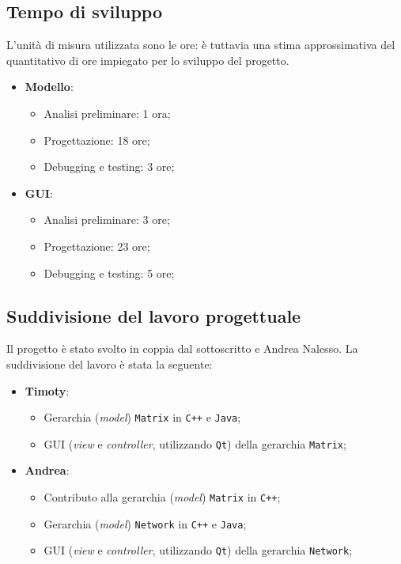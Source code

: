 \subsection{Tempo di sviluppo} 
L'unità di misura utilizzata sono le ore: è tuttavia una stima approssimativa del 
quantitativo di ore impiegato per lo sviluppo del progetto.
\begin{itemize}
    \item \textbf{Modello}:
    \begin{itemize}
        \item Analisi preliminare: 1 ora;
        \item Progettazione: 18 ore;
        \item Debugging e testing: 3 ore;
    \end{itemize}
    \item \textbf{GUI}:
    \begin{itemize}
        \item Analisi preliminare: 3 ore;
        \item Progettazione: 23 ore;
        \item Debugging e testing: 5 ore;
    \end{itemize}
\end{itemize}

\subsection{Suddivisione del lavoro progettuale}
Il progetto è stato svolto in coppia dal sottoscritto e Andrea Nalesso. La suddivisione del 
lavoro è stata la seguente:
\begin{itemize}
    \item \textbf{Timoty}:
    \begin{itemize}
        \item Gerarchia (\emph{model}) \texttt{Matrix} in \texttt{C++} e \texttt{Java};
        \item GUI (\emph{view} e \emph{controller}, utilizzando \texttt{Qt}) della gerarchia \texttt{Matrix};
    \end{itemize}
    \item \textbf{Andrea}:
    \begin{itemize}
        \item Contributo alla gerarchia (\emph{model}) \texttt{Matrix} in \texttt{C++};
        \item Gerarchia (\emph{model}) \texttt{Network} in \texttt{C++} e \texttt{Java};
        \item GUI (\emph{view} e \emph{controller}, utilizzando \texttt{Qt}) della gerarchia \texttt{Network};
    \end{itemize}
\end{itemize}

